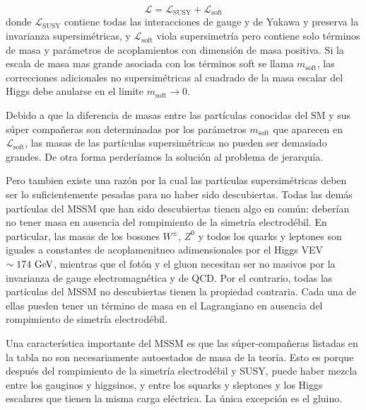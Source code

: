 \begin{equation}
  \mathcal{L} = \mathcal{L}_\text{SUSY} + \mathcal{L}_\text{soft}
\end{equation}
%
donde $\mathcal{L}_\text{SUSY}$ contiene todas las interacciones de gauge y
de Yukawa y preserva la invarianza supersimétricas, y $\mathcal{L}_\text{soft}$
viola supersimetría pero contiene solo términos de masa y parámetros de
acoplamientos con dimensión de masa positiva.
Si la escala de masa mas grande asociada  con los términos soft se llama $m_\text{soft}$,
las correcciones adicionales no supersimétricas al cuadrado de la masa escalar del Higgs
debe anularse en el limite $m_\text{soft} \to 0$.

Debido a que la diferencia de masas entre las partículas conocidas del SM y sus
súper compañeras son determinadas por los parámetros $m_\text{soft}$ que aparecen
en $\mathcal{L}_\text{soft}$, las masas de las partículas supersimétricas no
pueden ser demasiado grandes. De otra forma perderíamos la solución al problema
de jerarquía.

Pero tambien existe una razón por la cual las partículas supersimétricas deben ser lo
suficientemente pesadas para no haber sido descubiertas. Todas las demás partículas del
MSSM que han sido descubiertas tienen algo en com\'un: deberían no tener masa en ausencia
del rompimiento de la simetría electrodébil.
En particular, las masas de los bosones $W^\pm$, $Z^0$ y todos los quarks y leptones
son iguales a constantes de acoplamenitneo adimensionales por el Higgs VEV $\sim 174 \gev$,
mientras que el fotón y el gluon necesitan ser no masivos por la invarianza de gauge
electromagnética y de QCD. Por el contrario, todas las partículas del MSSM no descubiertas
tienen la propiedad contraria. Cada una de ellas pueden tener un término de masa en el
Lagrangiano en ausencia del rompimiento de simetría electrodébil.

Una característica importante del MSSM es que las súper-compañeras listadas en la
tabla no son necesariamente autoestados de masa de la teoría. Esto es porque después
del rompimiento de la simetría electrodébil y SUSY, puede haber mezcla entre los gauginos
y higgsinos, y entre los squarks y sleptones y los Higgs escalares que tienen la misma
carga eléctrica. La única excepción es el gluino.



